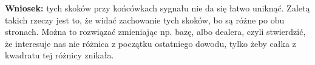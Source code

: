 \documentclass[../main.tex]{subfiles}
\begin{document}
\textbf{Wniosek:} tych skoków przy końcówkach sygnału nie da się łatwo uniknąć. Zaletą takich rzeczy jest to, że widać zachowanie tych skoków, bo są różne po obu stronach. Można to rozwiązać zmieniając np. bazę, albo dealera, czyli stwierdzić, że interesuje nas nie różnica z początku ostatniego dowodu, tylko żeby całka z kwadratu tej różnicy znikała.
\end{document}

